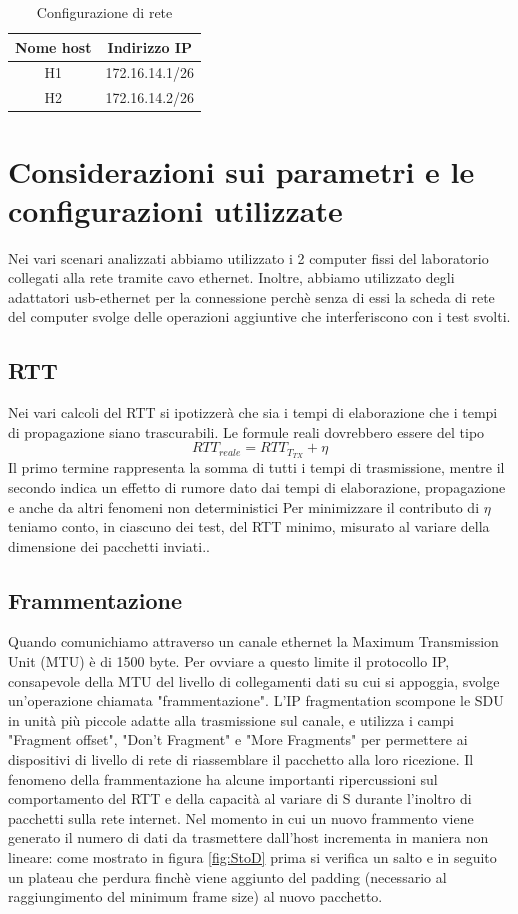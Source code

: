 \documentclass{exam}
\begin{document}
\begin{table}[h!]
	\centering
	\begin{tabular}{|c|c|}
		\hline
		Nome host & Indirizzo IP   \\
		\hline
		H1        & 172.16.14.1/26 \\
		\hline
		H2        & 172.16.14.2/26 \\
		\hline
	\end{tabular}
	\caption{Configurazione di rete}
	\label{tab:testbed}
\end{table}

\section{Considerazioni sui parametri e le configurazioni utilizzate}
Nei vari scenari analizzati abbiamo utilizzato i 2 computer fissi del laboratorio collegati alla rete tramite cavo ethernet. Inoltre, abbiamo utilizzato degli adattatori usb-ethernet per la connessione perchè senza di essi la scheda di rete del computer svolge delle operazioni aggiuntive che interferiscono con i test svolti.
\subsection{RTT}
Nei vari calcoli del RTT si ipotizzerà che sia i tempi di elaborazione che i tempi di propagazione siano trascurabili. Le formule reali dovrebbero essere del tipo
\begin{equation}
	RTT_{reale} = RTT_{T_{TX}} + \eta
\end{equation}
Il primo termine rappresenta la somma di tutti i tempi di trasmissione, mentre il secondo indica un effetto di rumore dato dai tempi di elaborazione, propagazione e anche da altri fenomeni non deterministici
Per minimizzare il contributo di $\eta$ teniamo conto, in ciascuno dei test, del RTT minimo, misurato al variare della dimensione dei pacchetti inviati.. 
\subsection{Frammentazione}
Quando comunichiamo attraverso un canale ethernet la Maximum Transmission Unit (MTU) è di 1500 byte. Per ovviare a questo limite il protocollo IP, consapevole della MTU del livello di collegamenti dati su cui si appoggia, svolge un'operazione chiamata "frammentazione". L'IP fragmentation scompone le SDU in unità più piccole adatte alla trasmissione sul canale, e utilizza i campi "Fragment offset", "Don't Fragment" e "More Fragments" per permettere ai dispositivi di livello di rete di riassemblare il pacchetto alla loro ricezione.
Il fenomeno della frammentazione ha alcune importanti ripercussioni sul comportamento del RTT e della capacità al variare di S durante l'inoltro di pacchetti sulla rete internet.
Nel momento in cui un nuovo frammento viene generato il numero di dati da trasmettere dall'host incrementa in maniera non lineare: come mostrato in figura \ref{fig:StoD} prima si verifica un salto e in seguito un plateau che perdura finchè viene aggiunto del padding (necessario al raggiungimento del minimum frame size) al nuovo pacchetto.
\end{document}
